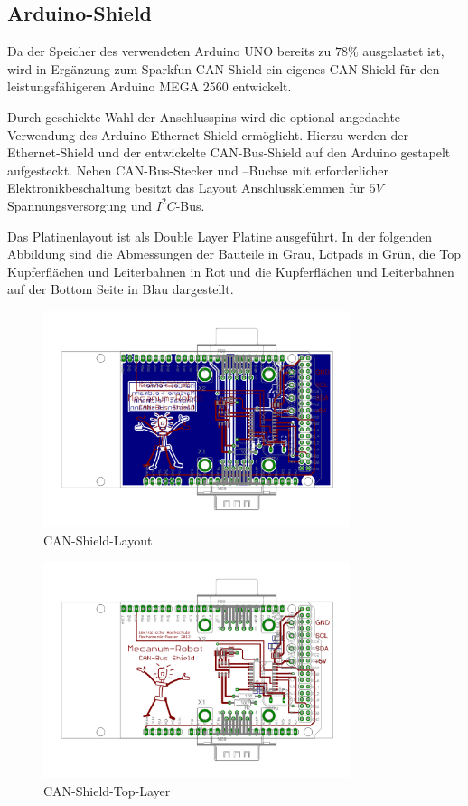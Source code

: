 \subsection{Arduino-Shield}
\label{sec:Arduino-Shield}
Da der Speicher des verwendeten Arduino UNO bereits zu $78\%$ ausgelastet ist, wird in Ergänzung zum Sparkfun CAN-Shield ein eigenes CAN-Shield für den leistungsfähigeren Arduino MEGA 2560 entwickelt.

Durch geschickte Wahl der Anschlusspins wird die optional angedachte Verwendung des Arduino-Ethernet-Shield ermöglicht. Hierzu werden der Ethernet-Shield und der entwickelte CAN-Bus-Shield auf den Arduino gestapelt aufgesteckt. Neben CAN-Bus-Stecker und –Buchse mit erforderlicher Elektronikbeschaltung besitzt das Layout Anschlussklemmen für $5V$ Spannungsversorgung und $I^{2}C$-Bus.

Das Platinenlayout ist als Double Layer Platine ausgeführt. In der folgenden Abbildung
sind die Abmessungen der Bauteile  in Grau, Lötpads in Grün, die Top Kupferflächen und Leiterbahnen in Rot und die Kupferflächen  und Leiterbahnen auf der Bottom Seite in Blau dargestellt.

\begin{figure}[H]
\centering
 \includegraphics[width=0.8\textwidth]{Abbildungen/CAN-Shield-Layout}
\caption[CAN-Shield-Layout]{CAN-Shield-Layout}
\label{fig:CAN-Shield-Layout}
\end{figure}

\begin{figure}[H]
\centering
 \includegraphics[width=0.8\textwidth]{Abbildungen/CAN-Shield-Layout-Top}
\caption[CAN-Shield-Top-Layer]{CAN-Shield-Top-Layer}
\label{fig:CAN-Shield-Layout-Top}
\end{figure}

